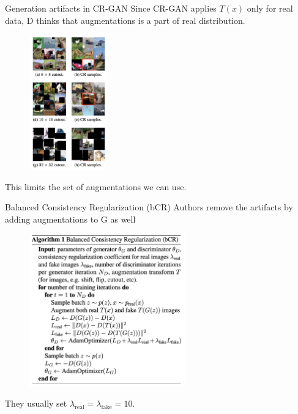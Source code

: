 \documentclass[handout, 10pt]{beamer}
\begin{document}
\begin{frame}{Generation artifacts in CR-GAN}
Since CR-GAN applies $T(x)$ only for real data, D thinks that augmentations is a part of real distribution.
\begin{figure}
\centering
\includegraphics[width=0.3\textwidth]{images/cr-gan-generation-artifacts}
\end{figure}

\pause
This limits the set of augmentations we can use.
\end{frame}


\begin{frame}{Balanced Consistency Regularization (bCR)}
Authors remove the artifacts by adding augmentations to G as well
\begin{figure}
\centering
\includegraphics[width=0.6\textwidth]{images/bcr-algorithm}
\end{figure}
They usually set $\lambda_\text{real} = \lambda_\text{fake} = 10$.
\end{frame}
\end{document}
